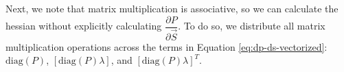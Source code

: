 \documentclass{article}
\begin{document}
Next, we note that matrix multiplication is associative, so we can calculate the hessian without explicitly calculating $\dfrac{\partial P}{\partial \vec{S}}$. To do so, we distribute all matrix multiplication operations across the terms in Equation \ref{eq:dp-ds-vectorized}: $\textrm{diag} \left( P \right)$, $\left[ \textrm{diag} \left( P \right) \lambda \right]$, and $\left[ \textrm{diag} \left( P \right) \lambda \right]^T$.
\end{document}

